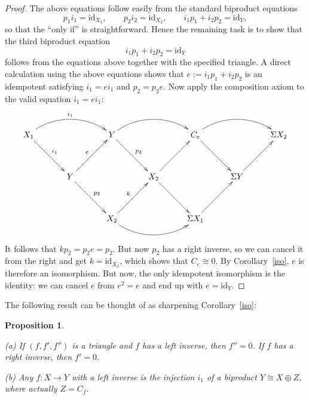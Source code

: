 \documentclass{amsproc}
\newtheorem{prop}{Proposition}[section]
\theoremstyle{definition}
\begin{document}
\begin{proof}
The above equations follow easily from the standard biproduct equations
\begin{displaymath}
p_1i_1={\mathrm{id}}_{X_1},\qquad p_2i_2={\mathrm{id}}_{X_2},\qquad i_1p_1+i_2p_2={\mathrm{id}}_Y,
\end{displaymath}
so that the ``only if'' is straightforward. Hence the remaining task is to show that the third biproduct equation
\begin{displaymath}
i_1p_1+i_2p_2={\mathrm{id}}_Y
\end{displaymath}
follows from the equations above together with the specified triangle. A direct calculation using the above equations shows that $e:= i_1p_1+i_2p_2$ is an idempotent satisfying $i_1=ei_1$ and $p_2=p_2e$. Now apply the composition axiom to the valid equation $i_1=ei_1$:
\begin{displaymath}
\xymatrix@!{X_1\ar@(ru,lu)[rr]^{i_1}\ar[rd]^{i_1} & & Y\ar@(ru,lu)[rr]^{}\ar[rd]^{p_2} & & C_e\ar@(ru,lu)[rr]^{}\ar[rd]^{} & & {\Sigma X_2}\\
& Y\ar[ur]^e\ar[rd]^{p_2} & & X_2\ar[ru]^{}\ar[rd]^{} & & {\Sigma Y}\ar[ru]_{} &\\
& & X_2\ar@(rd,ld)[rr]^{}\ar[ru]^k & & {\Sigma X_1}\ar[ru]_{} & &}
\end{displaymath}
It follows that $kp_2=p_2e=p_2$. But now $p_2$ has a right inverse, so we can cancel it from the right and get $k={\mathrm{id}}_{X_2}$, which shows that $C_e\cong 0$. By Corollary~\ref{iso}, $e$ is therefore an isomorphism. But now, the only idempotent isomorphism is the identity: we can cancel $e$ from $e^2=e$ and end up with $e={\mathrm{id}}_Y$.
\end{proof}

The following result can be thought of as sharpening Corollary~\ref{iso}:

\begin{prop}
\label{split}
\begin{compactenum}
\item[(a)]
If $(f,f',f'')$ is a triangle and $f$ has a left inverse, then $f''=0$. If $f$ has a right inverse, then $f'=0$.
\item[(b)]
\label{splitbiproduct}
Any $f:X{\longrightarrow} Y$ with a left inverse is the injection $i_1$ of a biproduct $Y\cong X\oplus Z$, where actually $Z=C_f$.
\end{compactenum}
\end{prop}
\end{document}
